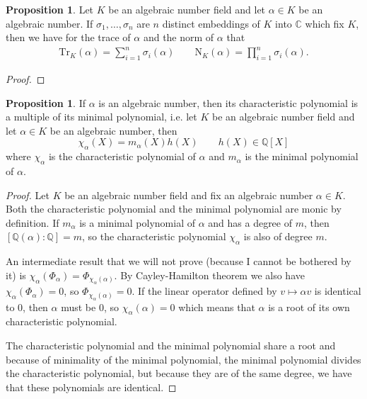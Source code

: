 \documentclass[a4paper]{book}
\theoremstyle{definition}
\newtheorem{proposition}[definition]{Proposition}
\begin{document}
\begin{thmbox}
    \begin{proposition}
        Let \(K\) be an algebraic number field and let \(\alpha \in K\) be an algebraic number. If \(\sigma_1, \ldots, \sigma_n\) are \(n\) distinct embeddings of \(K\) into \(\mathbb{C}\) which fix \(K\), then we have for the trace of \(\alpha\) and the norm of \(\alpha\) that
        \begin{align*}
            \mathrm{Tr}_K(\alpha) = \sum_{i=1}^n \sigma_i(\alpha) \qquad \mathrm{N}_K(\alpha) = \prod_{i=1}^n \sigma_i(\alpha)\text{.}
        \end{align*}
    \end{proposition}
\end{thmbox}
\begin{proof}
    
\end{proof}

\begin{thmbox}
    \begin{proposition}
        If \(\alpha\) is an algebraic number, then its characteristic polynomial is a multiple of its minimal polynomial, i.e. let \(K\) be an algebraic number field and let \(\alpha \in K\) be an algebraic number, then
        \begin{equation*}
            \chi_\alpha(X) = m_\alpha(X) h(X) \qquad h(X) \in \mathbb{Q}[X]
        \end{equation*}
        where \(\chi_\alpha\) is the characteristic polynomial of \(\alpha\) and \(m_\alpha\) is the minimal polynomial of \(\alpha\).
    \end{proposition}
\end{thmbox}
\begin{proof}
    Let \(K\) be an algebraic number field and fix an algebraic number \(\alpha \in K\). Both the characteristic polynomial and the minimal polynomial are monic by definition. If \(m_\alpha\) is a minimal polynomial of \(\alpha\) and has a degree of \(m\), then \([\mathbb{Q}(\alpha) : \mathbb{Q}] = m\), so the characteristic polynomial \(\chi_\alpha\) is also of degree \(m\).

    An intermediate result that we will not prove (because I cannot be bothered by it) is \(\chi_\alpha(\Phi_\alpha) = \Phi_{\chi_\alpha(\alpha)}\). By Cayley-Hamilton theorem we also have \(\chi_\alpha(\Phi_\alpha) = 0\), so \(\Phi_{\chi_\alpha(\alpha)} = 0\). If the linear operator defined by \(v \mapsto \alpha v\) is identical to \(0\), then \(\alpha\) must be \(0\), so \(\chi_\alpha(\alpha) = 0\) which means that \(\alpha\) is a root of its own characteristic polynomial.

    The characteristic polynomial and the minimal polynomial share a root and because of minimality of the minimal polynomial, the minimal polynomial divides the characteristic polynomial, but because they are of the same degree, we have that these polynomials are identical.
\end{proof}
\end{document}

